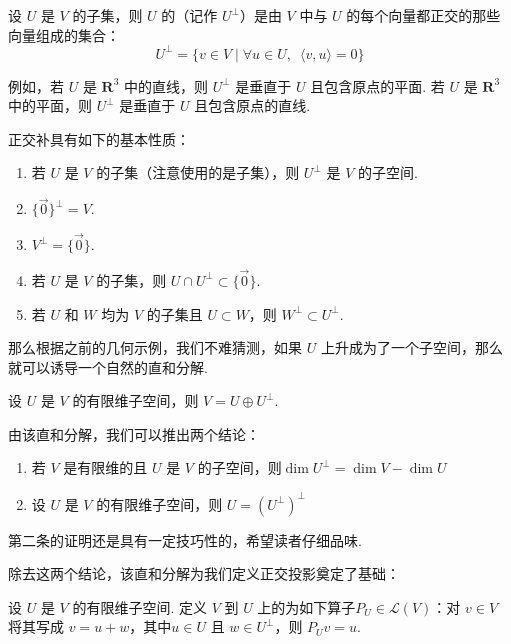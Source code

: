 \begin{definition}[正交补] 
    设 $ U $ 是 $ V $ 的子集，则 $ U $ 的（记作 $ U^{\perp } $）是由 $ V $ 中与 $ U $ 的每个向量都正交的那些向量组成的集合：
    \[U^{\perp } = \{ v \in V \mid \forall u \in U, \enspace \langle v, u\rangle = 0\}\]
\end{definition}

例如，若 $ U $ 是 $ \mathbf{R}^{3} $ 中的直线，则 $ U^{\perp } $ 是垂直于 $ U $ 且包含原点的平面. 若 $ U $ 是 $ \mathbf{R}^{3} $ 中的平面，则 $ U^{\perp } $ 是垂直于 $ U $ 且包含原点的直线.

正交补具有如下的基本性质：
\begin{enumerate}
    \item 若 $ U $ 是 $ V $ 的子集（注意使用的是子集），则 $ U^{\perp }$ 是 $ V $ 的子空间.

    \item $ \{ \vec{0} \}^{\perp } = V $.

    \item $ V^{\perp } = \{ \vec{0} \} $.

    \item 若 $ U $ 是 $ V $ 的子集，则 $ U \cap U^{\perp } \subset \{ \vec{0} \}$.

    \item 若 $ U $ 和 $ W $ 均为 $ V $ 的子集且 $ U \subset W $，则 $ W^{\perp } \subset U^{\perp }$.
\end{enumerate}

那么根据之前的几何示例，我们不难猜测，如果 $ U $ 上升成为了一个子空间，那么就可以诱导一个自然的直和分解.

\begin{theorem}
    设 $ U $ 是 $ V $ 的有限维子空间，则 $ V = U \oplus U^{\perp } $.
\end{theorem}

由该直和分解，我们可以推出两个结论：
\begin{enumerate}
    \item 若 $ V $ 是有限维的且 $ U $ 是 $ V $ 的子空间，则$ \dim U^{\perp }= \dim V - \dim U$

    \item 设 $ U $ 是 $ V $ 的有限维子空间，则 $ U = (U^{\perp})^{\perp} $
\end{enumerate}
第二条的证明还是具有一定技巧性的，希望读者仔细品味.

除去这两个结论，该直和分解为我们定义正交投影奠定了基础：
\begin{definition} 
    设 $ U $ 是 $ V $ 的有限维子空间. 定义 $ V $ 到 $ U $ 上的为如下算子$ P_U \in \mathcal{L} (V)$：对 $ v \in V $ 将其写成 $ v = u + w $，其中$ u \in U $ 且 $ w \in U^{\perp }$，则 $ P_U v = u $.
\end{definition}

